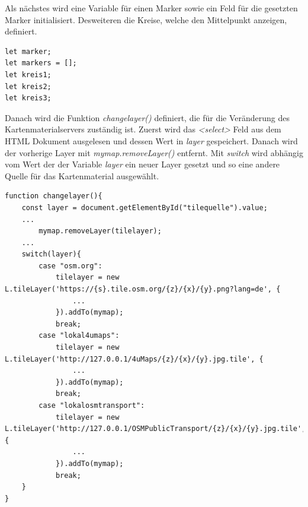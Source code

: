 \documentclass[a4paper, 12pt]{scrreprt}
\begin{document}
Als nächstes wird eine Variable für einen Marker sowie ein Feld für die gesetzten Marker initialisiert.
Desweiteren die Kreise, welche den Mittelpunkt anzeigen, definiert.
\begin{lstlisting}
let marker;
let markers = [];
let kreis1;
let kreis2;
let kreis3;
\end{lstlisting}
Danach wird die Funktion \textit{changelayer()} definiert, die für die Veränderung des Kartenmaterialservers zuständig ist.
Zuerst wird das \textit{<select>} Feld aus dem HTML Dokument ausgelesen und dessen Wert in \textit{layer} gespeichert.
Danach wird der vorherige Layer mit \textit{mymap.removeLayer()} entfernt.
Mit \textit{switch} wird abhängig vom Wert der der Variable \textit{layer} ein neuer Layer gesetzt und so eine andere Quelle für das Kartenmaterial ausgewählt.
\begin{lstlisting}
function changelayer(){
	const layer = document.getElementById("tilequelle").value;
	...
		mymap.removeLayer(tilelayer);
	...
	switch(layer){
		case "osm.org":
			tilelayer = new L.tileLayer('https://{s}.tile.osm.org/{z}/{x}/{y}.png?lang=de', {
				...
			}).addTo(mymap);
			break;
		case "lokal4umaps":
			tilelayer = new L.tileLayer('http://127.0.0.1/4uMaps/{z}/{x}/{y}.jpg.tile', {
				...
			}).addTo(mymap);
			break;
		case "lokalosmtransport":
			tilelayer = new L.tileLayer('http://127.0.0.1/OSMPublicTransport/{z}/{x}/{y}.jpg.tile', {
				...
			}).addTo(mymap);
			break;
	}
}
\end{lstlisting}
\end{document}
